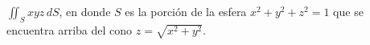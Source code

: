\item $\iint_S xyz \, dS$, en donde $S$ es la porción de la esfera $x^2 + y^2 + z^2 = 1$ que se encuentra arriba del cono $z = \sqrt{x^2 + y^2}$.
